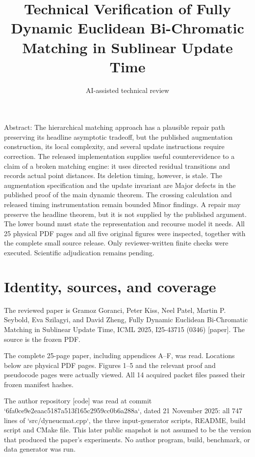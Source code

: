 \documentclass[10pt]{article}
\title{Technical Verification of Fully Dynamic Euclidean Bi-Chromatic Matching in Sublinear Update Time}
\author{AI-assisted technical review}
\date{}
\begin{document}
\maketitle
Abstract: The hierarchical matching approach has a plausible repair path preserving its headline asymptotic tradeoff, but the published augmentation construction, its local complexity, and several update instructions require correction. The released implementation supplies useful counterevidence to a claim of a broken matching engine: it uses directed residual transitions and records actual point distances. Its deletion timing, however, is stale. The augmentation specification and the update invariant are Major defects in the published proof of the main dynamic theorem. The crossing calculation and released timing instrumentation remain bounded Minor findings. A repair may preserve the headline theorem, but it is not supplied by the published argument. The lower bound must state the representation and recourse model it needs. All 25 physical PDF pages and all five original figures were inspected, together with the complete small source release. Only reviewer-written finite checks were executed. Scientific adjudication remains pending.\par
\section*{Identity, sources, and coverage}
The reviewed paper is Gramoz Goranci, Peter Kiss, Neel Patel, Martin P. Seybold, Eva Szilagyi, and David Zheng, Fully Dynamic Euclidean Bi-Chromatic Matching in Sublinear Update Time, ICML 2025, I25-43715 (0346) [paper]. The source is the frozen PDF.\par
The complete 25-page paper, including appendices A–F, was read. Locations below are physical PDF pages. Figures 1–5 and the relevant proof and pseudocode pages were actually viewed. All 14 acquired packet files passed their frozen manifest hashes.\par
The author repository [code] was read at commit `6fa0ce9e2eaac5187a513f165c2959cc0b6a288a`, dated 21 November 2025: all 747 lines of `src/dyneucmat.cpp`, the three input-generator scripts, README, build script and CMake file. This later public snapshot is not assumed to be the version that produced the paper’s experiments. No author program, build, benchmark, or data generator was run.\par
\end{document}
